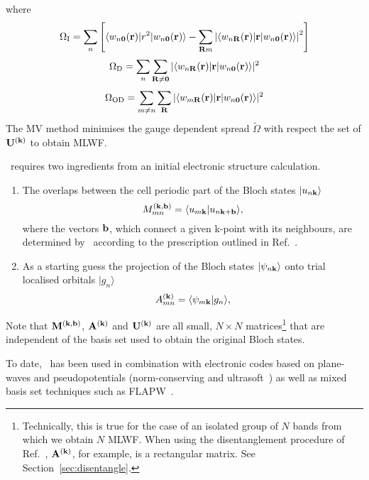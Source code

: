 where
\begin{equation}
\Omega_{{\rm I}}=\sum_n \left[\langle w_{n{\bf 0}}({\bf r})| r^2 | w_{n{\bf
      0}}({\bf r}) \rangle - \sum_{{\bf R}m} \left| \langle w_{n{\bf
      R}}({\bf r})| {\bf r} | w_{n{\bf 0}}({\bf r}) \rangle \right| ^2
      \right] 
\end{equation}
\begin{equation}
\Omega_{\rm D}=\sum_n \sum_{{\bf R}\neq{\bf 0}} |\langle w_{n{\bf
    R}}({\bf r})| {\bf r} | w_{n{\bf 0}}({\bf r}) \rangle|^2 
\end{equation}
\begin{equation}
\Omega_{\rm OD}=\sum_{m\neq n} \sum_{{\bf R}} |\langle w_{m{\bf R}}({\bf
  r})| {\bf r} | w_{n{\bf 0}}({\bf r}) \rangle |^2 
\end{equation}
The MV method minimises the gauge dependent spread $\tilde{\Omega}$
with respect the set of $\mathbf{U}^{(\mathbf{k})}$ to obtain MLWF.

\wannier\ requires two ingredients from an initial electronic
structure calculation. 
\begin{enumerate}
\item The overlaps between the cell periodic part of the Bloch states
  $|u_{n{\bf k}}\rangle$  
\begin{equation}
M_{mn}^{(\bf{k,b})}=\langle u_{m{\bf k}}|u_{n{\bf k}+{\bf b}}\rangle,
\end{equation}
where the vectors ${\bf b}$, which connect a given k-point with its
neighbours, are determined 
by \wannier\ according to the prescription outlined in Ref.~\cite{MV}.
\item As a starting guess the projection of the Bloch states
  $|\psi_{n\bf{k}}\rangle$ onto trial localised orbitals $|g_{n}\rangle$ 
\begin{equation}
A_{mn}^{(\bf{k})}=\langle \psi_{m{\bf k}}|g_{n}\rangle,
\end{equation}
\end{enumerate}
Note that $\mathbf{M}^{(\mathbf{k},\mathbf{b})}$, $\mathbf{A}^{(\mathbf{k})}$ and $\mathbf{U}^{(\mathbf{k})}$ are all small, $N \times
N$ matrices\footnote{Technically, this is true for the case of an
  isolated group of $N$ bands from which we obtain $N$ MLWF. When
  using the disentanglement procedure of Ref.~\cite{SMV}, $\mathbf{A}^{(\mathbf{k})}$, for
  example, is a rectangular matrix. See Section~\ref{sec:disentangle}.}
that are independent of the basis set used to obtain the original
Bloch states.

To date, \wannier\ has been used in combination with electronic codes
based on plane-waves and pseudopotentials (norm-conserving and
ultrasoft~\cite{USPP}) as well as mixed basis set techniques such as
FLAPW~\cite{MnO}.

